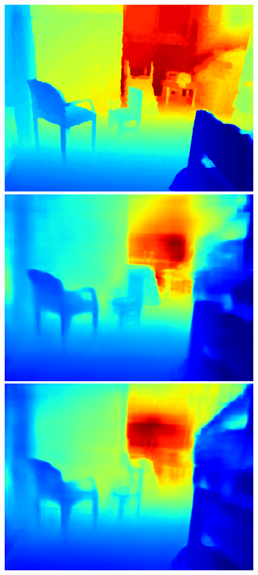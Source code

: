 \documentclass{svjour3}                     %
\begin{document}
\begin{figure}[t]
{\begin{minipage}[t]{0.15\linewidth}
  \includegraphics[width=1\linewidth]{images/nyu_gt/1078.png}
  \includegraphics[width=1\linewidth]{images/nyu_result/bedroom_rgb_01078.png}
  \includegraphics[width=1\linewidth]{images/nyu_without/bedroom_rgb_01078.png}

\end{minipage}}
\end{figure}
\end{document}
